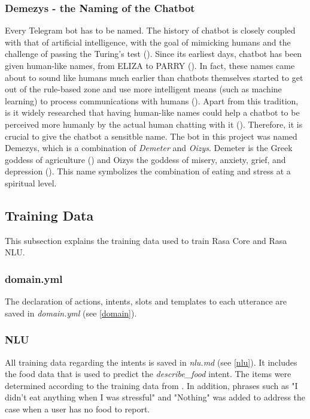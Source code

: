 \subsubsection{Demezys - the Naming of the Chatbot}
Every Telegram bot has to be named. The history of chatbot is closely coupled with that of artificial intelligence, with the goal of mimicking humans and the challenge of passing the Turing's test (\cite{38_turing}). Since its earliest days, chatbot has been given human-like names, from ELIZA to PARRY (\cite{37_early_chatbots_1}). In fact, these names came about to sound like humans much earlier than chatbots themselves started to get out of the rule-based zone and use more intelligent means (such as machine learning) to process communications with humans (\cite{36_early_chatbots}). Apart from this tradition, is it widely researched that having human-like names could help a chatbot to be perceived more humanly by the actual human chatting with it (\cite{35_chatbot_name_1, 34_chatbot_name}). Therefore, it is crucial to give the chatbot a sensitble name. The bot in this project was named Demezys, which is a combination of \emph{Demeter} and \emph{Oizys}. Demeter is the Greek goddess of agriculture (\cite{39_demeter}) and Oizys the goddess of misery, anxiety, grief, and depression (\cite{40_oizys}). This name symbolizes the combination of eating and stress at a spiritual level.

\subsection{Training Data}
This subsection explains the training data used to train Rasa Core and Rasa NLU.

\subsubsection{domain.yml}
The declaration of actions, intents, slots and templates to each utterance are saved in \emph{domain.yml} (see \autoref{domain}).

\subsubsection{NLU}
All training data regarding the intents is saved in \emph{nlu.md} (see \autoref{nlu}). It includes the food data that is used to predict the \emph{describe\_food} intent. The items were determined according to the training data from \citeauthor{17_ludwig}. In addition, phrases such as "I didn't eat anything when I was stressful" and "Nothing" was added to address the case when a user has no food to report.


